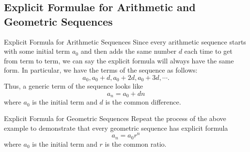 \subsection{Explicit Formulae for Arithmetic and Geometric Sequences}\label{Toemato}
\begin{example}{Explicit Formula for Arithmetic Sequences}
Since every arithmetic sequence starts with some initial term $a_0$ and then adds the same number $d$ each time to get from term to term, we can say the explicit formula will always have the same form.  In particular, we have the terms of the sequence as follows: $$a_0, a_0+d, a_0+2d, a_0+3d,\cdots. $$
Thus, a generic term of the sequence looks like $$a_n=a_0+dn$$ where $a_0$ is the initial term and $d$ is the common difference.
\end{example}
\begin{exercise}{Explicit Formula for Geometric Sequences \Coffeecup \Coffeecup}\label{UsedToBePlicit}
Repeat the process of the above example to demonstrate that every geometric sequence has explicit formula $$a_n=a_0r^n $$ where $a_0$ is the initial term and $r$ is the common ratio.

\end{exercise}